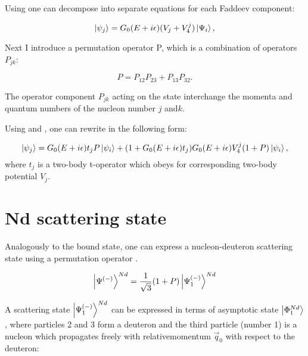     Using  one can decompose  into 
    separate equations for each Faddeev component:

    \begin{equation}
        \ket{\psi_j} = G_0(E+i\epsilon)(V_j + V_4^j) \ket{\Psi_i},
        \label{psi3_component}
    \end{equation}

    Next I introduce a permutation operator P, which is a combination
    of operators $P_{jk}$:
    
    \begin{equation}
        P = P_{12}P_{23} + P_{13}P_{32}.
        \label{permutation}
    \end{equation}

    The operator component $P_{jk}$ acting on the state interchange the momenta and  
    quantum numbers of the nucleon number $j$ and$k$.

    Using  and ,
    one can rewrite  in the following form:

    \begin{equation}
        \ket{\psi_j} = G_0(E+i\epsilon)t_j P \ket{\psi_i} + 
        (1 + G_0(E+i\epsilon)t_j)G_0(E+i\epsilon)V_4^j(1+P)\ket{\psi_i},        
    \end{equation}
    where $t_j$ is a two-body t-operator which obeys  for corresponding 
    two-body potential $V_j$.





\section{Nd scattering state}
\label{nd_state}

    Analogously to the bound state, one can express a nucleon-deuteron
    scattering state
    using a permutation operator .

    \begin{equation}
        \ket{\Psi^{(-)}}^{Nd} = \frac{1}{\sqrt{3}}(1+P)\ket{\Psi^{(-)}_1}^{Nd}    
    \end{equation}

    A scattering state $\ket{\Psi^{(-)}_1}^{Nd}$ can be expressed
    in terms of asymptotic state $\ket{\Phi^{Nd}_1}$, where particles
    2 and 3 form a deuteron and the third particle (number 1) is a nucleon
    which propagates freely with relativemomentum $\vec{q}_0$ with 
    respect to the deuteron:


